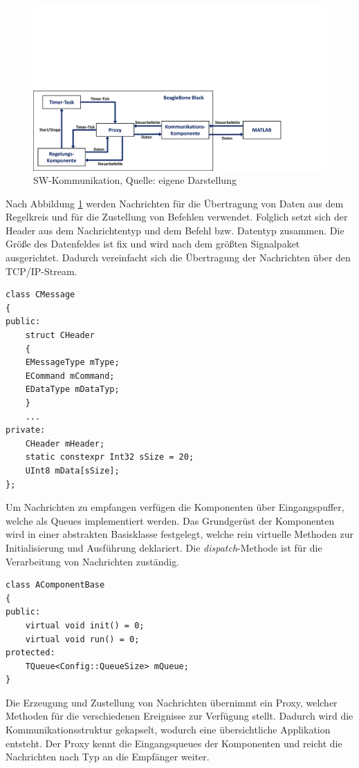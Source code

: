 \documentclass{article}
\begin{document}
\begin{figure}[!h]
\centering
\includegraphics[width=0.8\linewidth, trim={0cm 0cm 2cm 9cm},clip]{img/SW_kommunikation}
\caption{SW-Kommunikation, Quelle: eigene Darstellung}
\label{img_kommunikation_sw}
\end{figure}

Nach Abbildung \ref{img_kommunikation_sw} werden Nachrichten für die Übertragung von Daten aus dem Regelkreis und für die Zustellung von Befehlen verwendet. Folglich setzt sich der Header aus dem Nachrichtentyp und dem Befehl bzw. Datentyp zusammen. Die Größe des Datenfeldes ist fix und wird nach dem größten Signalpaket ausgerichtet. Dadurch vereinfacht sich die Übertragung der Nachrichten über den TCP/IP-Stream.

\begin{lstlisting}
class CMessage
{
public:
	struct CHeader
	{
	EMessageType mType;
	ECommand mCommand;
	EDataType mDataTyp;
	}
	...
private:
	CHeader mHeader;
	static constexpr Int32 sSize = 20;
	UInt8 mData[sSize];
};
\end{lstlisting}

Um Nachrichten zu empfangen verfügen die Komponenten über Eingangspuffer, welche als Queues implementiert werden. Das Grundgerüst der Komponenten wird in einer abstrakten Basisklasse festgelegt, welche rein virtuelle Methoden zur Initialisierung und Ausführung deklariert. Die \textit{dispatch}-Methode ist für die Verarbeitung von Nachrichten zuständig.

\begin{lstlisting}
class AComponentBase
{
public:
	virtual void init() = 0;
	virtual void run() = 0;
protected:
	TQueue<Config::QueueSize> mQueue;
}
\end{lstlisting}

Die Erzeugung und Zustellung von Nachrichten übernimmt ein Proxy, welcher Methoden für die verschiedenen Ereignisse zur Verfügung stellt. Dadurch wird die Kommunikationsstruktur gekapselt, wodurch eine übersichtliche Applikation entsteht. Der Proxy kennt die Eingangsqueues der Komponenten und reicht die Nachrichten nach Typ an die Empfänger weiter.
\end{document}
